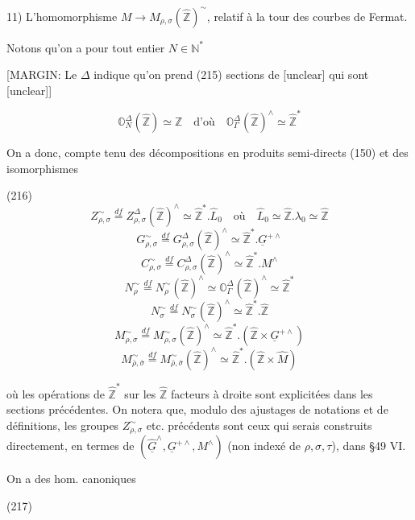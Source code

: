 \newpage


11) L'homomorphisme $M \to M_{\rho,\sigma}(\hat{\mathbb{Z}})^{\sim}$, relatif à la tour des courbes de Fermat.

Notons qu'on a pour tout entier $N \in \mathbb{N}^*$

[MARGIN: Le $\Delta$ indique qu'on prend (215) sections de [unclear] qui sont [unclear]]

$$ \mathbb{O}_N^{\Delta}(\hat{\mathbb{Z}}) \simeq \mathbb{Z} \quad \text{d'où} \quad \mathbb{O}_\Gamma^{\Delta}(\hat{\mathbb{Z}})^{\wedge} \simeq \hat{\mathbb{Z}}^* $$

On a donc, compte tenu des décompositions en produits semi-directs (150) et des isomorphismes

(216)
$$ Z_{\rho,\sigma}^\sim \overset{df}{=} Z_{\rho,\sigma}^\Delta(\hat{\mathbb{Z}})^\wedge \simeq \hat{\mathbb{Z}}^* . \hat{L}_0 \quad \text{où} \quad \hat{L}_0 \simeq \hat{\mathbb{Z}} . \lambda_0 \simeq \hat{\mathbb{Z}} $$
$$ G_{\rho,\sigma}^\sim \overset{df}{=} G_{\rho,\sigma}^\Delta(\hat{\mathbb{Z}})^\wedge \simeq \hat{\mathbb{Z}}^* . \underline{G}^{+\wedge} $$
$$ C_{\rho,\sigma}^\sim \overset{df}{=} C_{\rho,\sigma}^\Delta(\hat{\mathbb{Z}})^\wedge \simeq \hat{\mathbb{Z}}^* . M^\wedge $$
$$ N_{\rho}^\sim \overset{df}{=} N_\rho^\sim(\hat{\mathbb{Z}})^\wedge \simeq \mathbb{O}_\Gamma^\Delta(\hat{\mathbb{Z}})^\wedge \simeq \hat{\mathbb{Z}}^* $$
$$ N_{\sigma}^\sim \overset{df}{=} N_{\sigma}^\sim(\hat{\mathbb{Z}})^\wedge \simeq \hat{\mathbb{Z}}^* . \hat{\mathbb{Z}} $$
$$ M_{\rho,\sigma}^\sim \overset{df}{=} M_{\rho,\sigma}^\sim(\hat{\mathbb{Z}})^\wedge \simeq \hat{\mathbb{Z}}^* . (\hat{\mathbb{Z}} \times \underline{G}^{+\wedge}) $$
$$ M_{\bar{\rho},\bar{\sigma}}^\sim \overset{df}{=} M_{\bar{\rho},\bar{\sigma}}^\sim(\hat{\mathbb{Z}})^\wedge \simeq \hat{\mathbb{Z}}^* . (\hat{\mathbb{Z}} \times \hat{M}) $$

où les opérations de $\hat{\mathbb{Z}}^*$ sur les $\hat{\mathbb{Z}}$ facteurs à droite sont explicitées dans les sections précédentes. On notera que, modulo des ajustages de notations et de définitions, les groupes $Z_{\rho,\sigma}^\sim$ etc. précédents sont ceux qui serais construits directement, en termes de $(\hat{\underline{G}}^\wedge, \underline{G}^{+\wedge}, M^\wedge)$ (non indexé de $\rho,\sigma,\tau$), dans §49 VI.

On a des hom. canoniques

(217)

